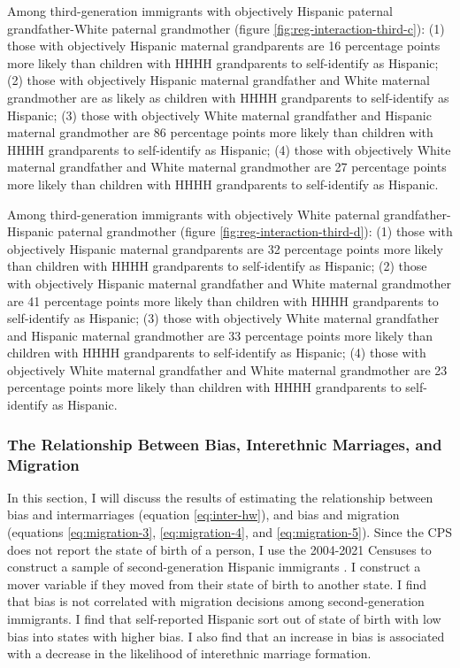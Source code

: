 \documentclass[12pt, fullpage]{article}
\begin{document}
Among third-generation immigrants with objectively Hispanic paternal grandfather-White paternal grandmother (figure \ref{fig:reg-interaction-third-c}): (1) those with objectively Hispanic maternal grandparents are 16 percentage points more likely than children with HHHH grandparents to self-identify as Hispanic; (2) those with objectively Hispanic maternal grandfather and White maternal grandmother are as likely as children with HHHH grandparents to self-identify as Hispanic; (3) those with objectively White maternal grandfather and Hispanic maternal grandmother are 86 percentage points more likely than children with HHHH grandparents to self-identify as Hispanic; (4) those with objectively White maternal grandfather and White maternal grandmother are 27 percentage points more likely than children with HHHH grandparents to self-identify as Hispanic. 

Among third-generation immigrants with objectively White paternal grandfather-Hispanic paternal grandmother (figure \ref{fig:reg-interaction-third-d}): (1) those with objectively Hispanic maternal grandparents are 32 percentage points more likely than children with HHHH grandparents to self-identify as Hispanic; (2) those with objectively Hispanic maternal grandfather and White maternal grandmother are 41 percentage points more likely than children with HHHH grandparents to self-identify as Hispanic; (3) those with objectively White maternal grandfather and Hispanic maternal grandmother are 33 percentage points more likely than children with HHHH grandparents to self-identify as Hispanic; (4) those with objectively White maternal grandfather and White maternal grandmother are 23 percentage points more likely than children with HHHH grandparents to self-identify as Hispanic. 


\subsubsection{The Relationship Between Bias, Interethnic Marriages, and Migration}\label{sub:inter_eth_mar}

In this section, I will discuss the results of estimating the relationship between bias and intermarriages (equation \ref{eq:inter-hw}), and bias and migration (equations \ref{eq:migration-3}, \ref{eq:migration-4}, and \ref{eq:migration-5}). Since the CPS does not report the state of birth of a person, I use the 2004-2021 Censuses to construct a sample of second-generation Hispanic immigrants \citep{floodsarahIntegratedPublicUse2021}. I construct a mover variable if they moved from their state of birth to another state. I find that bias is not correlated with migration decisions among second-generation immigrants. I find that self-reported Hispanic sort out of state of birth with low bias into states with higher bias. I also find that an increase in bias is associated with a decrease in the likelihood of interethnic marriage formation.
\end{document}
